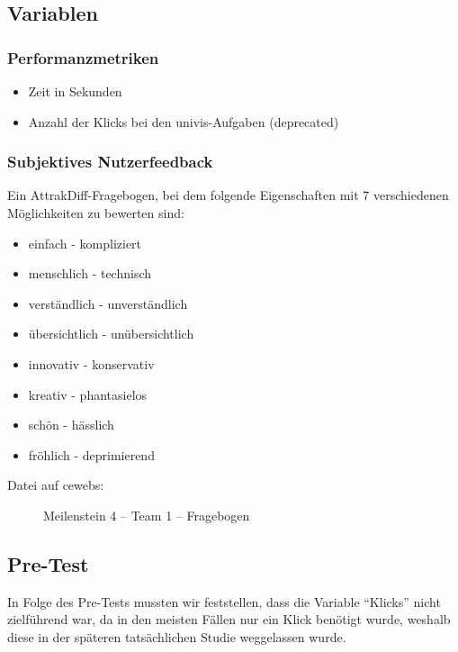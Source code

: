 \documentclass[a4paper,10pt]{scrartcl}
\begin{document}
\subsection{Variablen}

\subsubsection{Performanzmetriken}

\begin{itemize}
 \item Zeit in Sekunden
 \item Anzahl der Klicks bei den univis-Aufgaben (deprecated)
\end{itemize}

\subsubsection{Subjektives Nutzerfeedback}

Ein AttrakDiff-Fragebogen, bei dem folgende Eigenschaften mit 7 verschiedenen Möglichkeiten zu bewerten sind:

\begin{itemize}
\item einfach - kompliziert 
\item menschlich - technisch
\item verständlich - unverständlich
\item übersichtlich - unübersichtlich 
\item innovativ - konservativ
\item kreativ - phantasielos
\item schön - hässlich
\item fröhlich - deprimierend 
\end{itemize}

\begin{description}
 \item[Datei auf cewebs:] Meilenstein 4 -- Team 1 -- Fragebogen
\end{description}

\subsection{Pre-Test}

In Folge des Pre-Tests mussten wir feststellen, dass die Variable ``Klicks'' nicht zielführend war,
da in den meisten Fällen nur ein Klick benötigt wurde, weshalb diese in der späteren tatsächlichen Studie weggelassen wurde.
\end{document}
